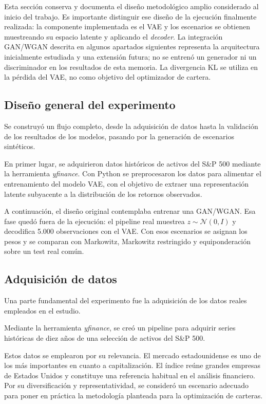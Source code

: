 Esta sección conserva y documenta el diseño metodológico amplio considerado al inicio del trabajo. Es importante distinguir ese diseño de la ejecución finalmente realizada: la componente implementada es el VAE y los escenarios se obtienen muestreando su espacio latente y aplicando el \textit{decoder}. La integración GAN/WGAN descrita en algunos apartados siguientes representa la arquitectura inicialmente estudiada y una extensión futura; no se entrenó un generador ni un discriminador en los resultados de esta memoria. La divergencia KL se utiliza en la pérdida del VAE, no como objetivo del optimizador de cartera.

\subsection{Diseño general del experimento}

Se construyó un flujo completo, desde la adquisición de datos hasta la validación de los resultados de los modelos, pasando por la generación de escenarios sintéticos.

En primer lugar, se adquirieron datos históricos de activos del S\&P 500 mediante la herramienta \textit{yfinance}. Con Python se preprocesaron los datos para alimentar el entrenamiento del modelo VAE, con el objetivo de extraer una representación latente subyacente a la distribución de los retornos observados.

A continuación, el diseño original contemplaba entrenar una GAN/WGAN. Esa fase quedó fuera de la ejecución: el pipeline real muestrea $z\sim\mathcal{N}(0,I)$ y decodifica 5.000 observaciones con el VAE. Con esos escenarios se asignan los pesos y se comparan con Markowitz, Markowitz restringido y equiponderación sobre un test real común.

\subsection{Adquisición de datos}

Una parte fundamental del experimento fue la adquisición de los datos reales empleados en el estudio.

Mediante la herramienta \textit{yfinance}, se creó un pipeline para adquirir series históricas de diez años de una selección de activos del S\&P 500.

Estos datos se emplearon por su relevancia. El mercado estadounidense es uno de los más importantes en cuanto a capitalización. El índice reúne grandes empresas de Estados Unidos y constituye una referencia habitual en el análisis financiero. Por su diversificación y representatividad, se consideró un escenario adecuado para poner en práctica la metodología planteada para la optimización de carteras.

